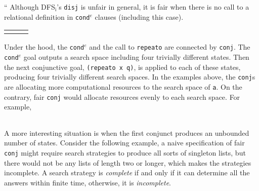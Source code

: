 \documentclass[format=acmlarge, review=true, authordraft=true]{acmart}
\newcommand{\conde}{\texttt{cond$^e$}}
\newcommand{\conj}{\texttt{conj}}
\newcommand{\disj}{\texttt{disj}}
\begin{document}

``
Although 
DFS$_\textrm{i}$'s \disj{} is unfair in general, it is fair when there is no 
call to a relational definition 
in \conde{} clauses (including this case).

\begin{center}
\begin{tabular}{l|c|r}
     &
     &
     \\
\end{tabular}
\end{center}

Under the hood, the \conde{} and the call to \texttt{repeato} are connected by 
\conj{}. The \conde{} goal outputs a search space including four trivially 
different states. Then the next conjunctive goal, \texttt{(repeato x q)}, is 
applied to each of these states, producing four trivially different search 
spaces. In the examples above, the \conj{}s are allocating more computational 
resources to the search space of \texttt{a}. On the contrary, fair \conj{} 
would allocate resources evenly to each search space. For example,

\begin{center}
	\begin{tabular}{c}
		
	\end{tabular}
\end{center}

A more interesting situation is when the first conjunct produces an unbounded
number of states. Consider the following example, a naive specification of fair \conj{} 
might require search strategies to produce all sorts of singleton lists, but there
would not be any lists of length two or longer, which makes the strategies incomplete. 
A search strategy is \emph{complete} if and only if it can determine all the answers within finite 
time, otherwise, it is \emph{incomplete}.


\begin{center}
	\begin{tabular}{c}
		
	\end{tabular}
\end{center}
\end{document}
